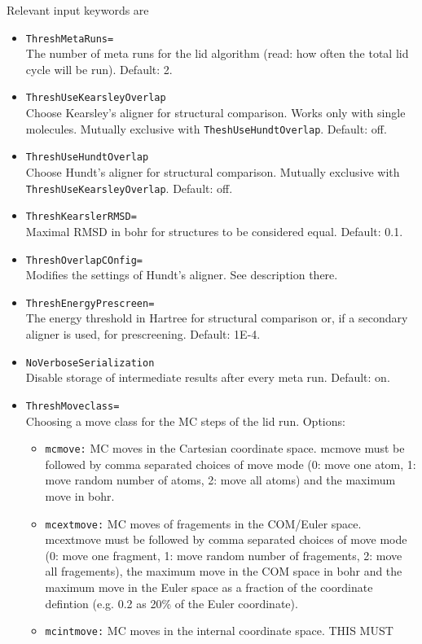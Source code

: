 \documentclass[a4paper,10pt]{scrbook}
\begin{document}
Relevant input keywords are
\begin{itemize}
 \item \texttt{ThreshMetaRuns=}\\ The number of meta runs for the lid algorithm
(read: how often the total lid cycle will be run). Default: 2.
 \item \texttt{ThreshUseKearsleyOverlap}\\ Choose Kearsley's aligner for
structural comparison. Works only with single molecules. Mutually exclusive with
\texttt{TheshUseHundtOverlap}. Default: off.
 \item \texttt{ThreshUseHundtOverlap}\\ Choose Hundt's aligner for structural
comparison. Mutually exclusive with \texttt{ThreshUseKearsleyOverlap}. Default:
off.
 \item \texttt{ThreshKearslerRMSD=}\\ Maximal RMSD in bohr for structures to be
considered equal. Default: 0.1.
 \item \texttt{ThreshOverlapCOnfig=}\\ Modifies the settings of Hundt's aligner.
See description there.
 \item \texttt{ThreshEnergyPrescreen=}\\ The energy threshold in Hartree for
structural comparison or, if a secondary aligner is used, for prescreening.
Default: 1E-4.
 \item \texttt{NoVerboseSerialization}\\ Disable storage of intermediate results
after every meta run. Default: on.
 \item \texttt{ThreshMoveclass=}\\ Choosing a move class for the MC steps of the
lid run. Options:
 \begin{itemize}
  \item \texttt{mcmove:} MC moves in the Cartesian coordinate space. mcmove must
be followed by comma separated choices of move mode (0: move one atom, 1: move
random number of atoms, 2: move all atoms) and the maximum move in bohr.
  \item \texttt{mcextmove:} MC moves of fragements in the COM/Euler space.
mcextmove must be followed by comma separated choices of move mode (0: move one
fragment, 1: move random number of fragements, 2: move all fragements), the
maximum move in the COM space in bohr and the maximum move in the Euler space as
a fraction of the coordinate defintion (e.g. 0.2 as 20\% of the Euler
coordinate).
  \item \texttt{mcintmove:} MC moves in the internal coordinate space. THIS MUST

\end{itemize}
\end{itemize}
\end{document}
